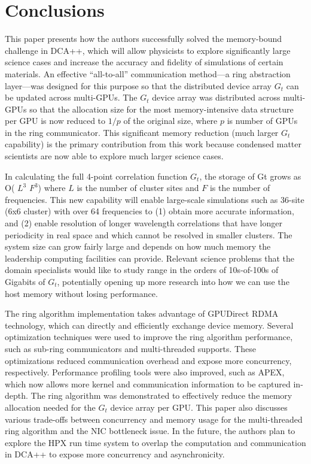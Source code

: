 \section{Conclusions}
\label{sec:concl}
This paper presents how the authors successfully solved the
memory-bound challenge in DCA++, which will allow physicists 
to explore significantly large science cases and increase
the accuracy and fidelity of simulations of certain materials.
%
An effective ``all-to-all'' communication method---a ring abstraction layer---was designed for this purpose so that the distributed device array $G_t$ can be updated across multi-GPUs.
%
The $G_t$ device array was distributed across 
multi-GPUs so that the allocation size for the most 
memory-intensive data structure per GPU is now reduced to $1/p$ of the original size, where $p$ is number of GPUs in the ring communicator.
%
This significant memory reduction (much larger $G_t$ capability) 
is the primary contribution 
from this work because condensed matter scientists are now able to 
explore much larger science cases.

In calculating the full 4-point correlation function $G_t$, 
the storage of Gt grows as O( $L^3$ $F^3$) 
where $L$ is the number of cluster sites 
and $F$ is the number of frequencies. 
%
This new capability will enable large-scale simulations 
such as  36-site (6x6 cluster) with over 64 frequencies to 
(1) obtain more accurate information, and 
(2) enable resolution of  longer wavelength correlations 
that have longer periodicity 
in real space and which cannot be resolved in smaller clusters. 
%
The system size can grow fairly large and 
depends on how much memory the leadership computing facilities
can provide. 
%
Relevant science problems that the domain specialists 
would like to study range in the orders of 
10s-of-100s of Gigabits of $G_t$, 
potentially opening up more research 
into how we can use the host memory without losing performance. 
%

The ring algorithm implementation takes advantage of 
GPUDirect RDMA technology, which can directly and 
efficiently exchange device memory. 
%
Several optimization techniques were used to improve the ring algorithm performance,
such as sub-ring communicators
and multi-threaded supports. 
%
These optimizations reduced communication overhead and 
expose more concurrency, respectively.
%
Performance profiling tools were also improved, such as APEX, which 
now allows more kernel and communication information
to be captured in-depth.
%
The ring algorithm was demonstrated to effectively reduce the memory
allocation needed for the $G_t$ device array per GPU. 
%
This paper also discusses various trade-offs between concurrency and memory 
usage for the multi-threaded ring algorithm and the NIC bottleneck issue.
%
In the future, the authors plan to explore the HPX run time system to overlap 
the computation and communication in DCA++
to expose more concurrency and asynchronicity.

\balance